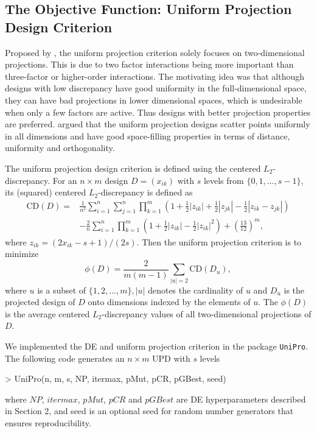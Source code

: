 \documentclass [PhD] {package/uclathes}
\begin{document}
\subsection*{The Objective Function: Uniform Projection Design Criterion}
Proposed by \textcite{sun2019uniform}, the uniform projection criterion solely focuses on  two-dimensional projections. This is due to two factor interactions being more important than three-factor or higher-order interactions. The motivating idea was that although designs with low discrepancy have good uniformity in the full-dimensional space, they can have bad projections in lower dimensional spaces, which is undesirable when only a few factors are active. Thus designs with better projection properties are preferred. \textcite{sun2019uniform} argued that the uniform projection designs scatter points uniformly in all dimensions and have good space-filling properties in terms of distance, uniformity and orthogonality.

The uniform projection design criterion is defined using the centered $L_2$-discrepancy.
For an $n \times m$ design $D=\left(x_{i k}\right)$ with $s$ levels from $\{0, 1, \ldots, s-1 \}$, its (squared) centered $L_2$-discrepancy is defined as
$$
\begin{aligned}
  \mathrm{CD}(D)= & \frac{1}{n^2} \sum_{i=1}^n \sum_{j=1}^n
  \prod_{k=1}^m\left(1+\frac{1}{2}\left|z_{i k}\right| +
  \frac{1}{2}\left|z_{j k}\right| -
  \frac{1}{2}\left|z_{i k}-z_{j k}\right|\right) \\
  & -\frac{2}{n} \sum_{i=1}^n \prod_{k=1}^m\left(1+\frac{1}{2}
  \left|z_{i k}\right|-\frac{1}{2}\left|z_{i k}\right|^2\right)+
  \left(\frac{13}{12}\right)^m,
  \end{aligned}
$$
where $z_{i k}=\left(2 x_{i k}-s+1\right) /(2 s)$. Then the uniform projection criterion is to minimize
\begin{equation}
  \phi(D)=\frac{2}{m(m-1)} \sum_{|u|=2} \mathrm{CD}\left(D_u\right),
  \label{upd}
\end{equation}
where $u$ is a subset of $\{1,2, \ldots, m\},|u|$ denotes the cardinality of $u$ and $D_u$ is the projected design of $D$ onto dimensions indexed by the elements of $u$. The $\phi(D)$ is the average centered $L_2$-discrepancy values of all two-dimensional projections of $D$.

We implemented the DE and uniform projection criterion in the package \texttt{UniPro}. %
The following code generates an $n\times m$ UPD with $s$ levels
\begin{Schunk}
\begin{Sinput}
> UniPro(n, m, s, NP, itermax, pMut, pCR, pGBest, seed)
\end{Sinput}
\end{Schunk}
where $NP$, $itermax$, $pMut$, $pCR$ and $pGBest$ are DE hyperparameters described in Section 2, and seed is an optional seed for random number generators that ensures reproducibility.
\end{document}
